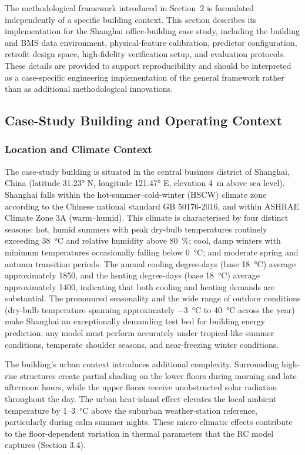 \documentclass[11pt]{article}
\providecommand{\m}{\metre}
\begin{document}
The methodological framework introduced in Section~2 is formulated independently of a specific building context. This section describes its implementation for the Shanghai office-building case study, including the building and BMS data environment, physical-feature calibration, predictor configuration, retrofit design space, high-fidelity verification setup, and evaluation protocols. These details are provided to support reproducibility and should be interpreted as a case-specific engineering implementation of the general framework rather than as additional methodological innovations.

\subsection{Case-Study Building and Operating Context}

\subsubsection{Location and Climate Context}

The case-study building is situated in the central business district of Shanghai, China (latitude \ang{31.23} N, longitude \ang{121.47} E, elevation \SI{4}{\m} above sea level). Shanghai falls within the hot-summer–cold-winter (HSCW) climate zone according to the Chinese national standard GB 50176-2016, and within ASHRAE Climate Zone 3A (warm–humid). This climate is characterised by four distinct seasons: hot, humid summers with peak dry-bulb temperatures routinely exceeding \SI{38}{\celsius} and relative humidity above \SI{80}{\percent}; cool, damp winters with minimum temperatures occasionally falling below \SI{0}{\celsius}; and moderate spring and autumn transition periods. The annual cooling degree-days (base \SI{18}{\celsius}) average approximately 1850, and the heating degree-days (base \SI{18}{\celsius}) average approximately 1400, indicating that both cooling and heating demands are substantial. The pronounced seasonality and the wide range of outdoor conditions (dry-bulb temperature spanning approximately \SI{-3}{\celsius} to \SI{40}{\celsius} across the year) make Shanghai an exceptionally demanding test bed for building energy prediction: any model must perform accurately under tropical-like summer conditions, temperate shoulder seasons, and near-freezing winter conditions.

The building's urban context introduces additional complexity. Surrounding high-rise structures create partial shading on the lower floors during morning and late afternoon hours, while the upper floors receive unobstructed solar radiation throughout the day. The urban heat-island effect elevates the local ambient temperature by \num{1}--\SI{3}{\celsius} above the suburban weather-station reference, particularly during calm summer nights. These micro-climatic effects contribute to the floor-dependent variation in thermal parameters that the RC model captures (Section 3.4).
\end{document}
